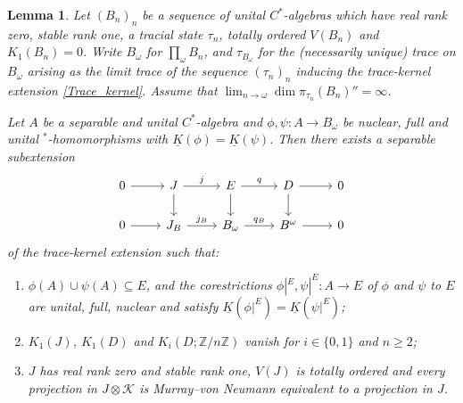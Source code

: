 \documentclass[reqno]{amsart}
\newtheorem{lem}[thm]{Lemma}
\theoremstyle{definition}
\theoremstyle{remark}
\numberwithin{equation}{section}
\theoremstyle{definition}
\begin{document}
\begin{lem}\label{seplem}
Let $(B_n)_{n}$ be a sequence of unital $C^*$-algebras which have real rank zero, stable rank one, a tracial state $\tau_n$, totally ordered $V(B_{n})$ and $K_1(B_n)=0$. Write $B_{\omega}$ for $\prod_{\omega}B_{n}$, and $\tau_{B_\omega}$ for the (necessarily unique) trace on $B_\omega$ arising as the limit trace of the sequence $(\tau_n)_n$ inducing the trace-kernel extension \eqref{Trace_kernel}. Assume that $\lim_{n\to\omega}\dim\pi_{\tau_n}(B_n)''=\infty$. 

Let $A$ be a separable and unital $C^{\ast}$-algebra and $\phi,\psi\colon A\to B_\omega$ be nuclear, full and unital $^*$-homomorphisms with $\underline{K}(\phi)=\underline{K}(\psi)$.  Then there exists a separable subextension
\begin{equation}\label{sepsubext}
\begin{tikzcd}
0\arrow[r]&J\arrow[r,"j"]\arrow[d]&E\arrow[r,"q"]\arrow[d]&D\arrow[r]\arrow[d]&0\\
0\arrow[r]&J_B\arrow[r,"j_B"]&B_{\omega}\arrow[r,"q_B"]&B^\omega\arrow[r]&0
\end{tikzcd}
\end{equation} 
of the trace-kernel extension such that:
\begin{enumerate}
\item \label{condition_sep_full} $\phi(A)\cup \psi(A)\subseteq E$, and the corestrictions $\phi|^E,\psi|^E\colon A\to E$ of $\phi$ and $\psi$ to $E$ are unital, full, nuclear and satisfy $\underline{K}(\phi|^E)=\underline{K}(\psi|^E)$; \label{seplem1}
\item $K_{1}(J)$, $K_{1}(D)$ and $K_{i}(D; \mathbb{Z} / n\mathbb{Z})$ vanish for $i\in \{0,1\}$ and $n\geq 2$; \label{seplem2}
\item \label{condition_sep_J}$J$ has real rank zero and stable rank one, $V(J)$ is totally ordered and every projection in $J\otimes\mathcal K$ is Murray--von Neumann equivalent to a projection in $J$. \label{seplem3}
\end{enumerate}
\end{lem}
\end{document}

